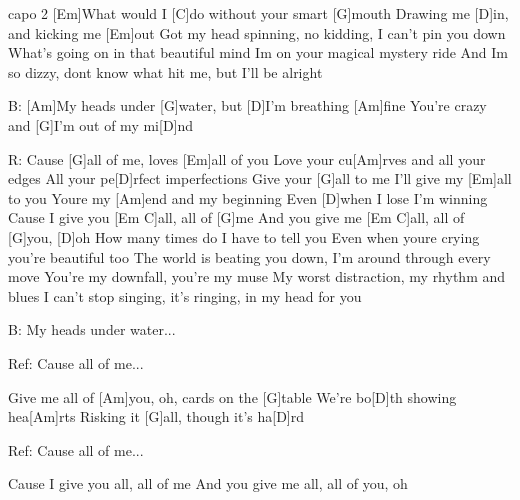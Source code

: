 
capo 2
[Em]What would I [C]do without your smart [G]mouth
Drawing me [D]in, and kicking me [Em]out
Got my head spinning, no kidding, 
I can't pin you down
What's going on in that beautiful mind
Im on your magical mystery ride
And Im so dizzy, dont know what hit me, 
but I'll be alright

B: [Am]My heads under [G]water, but [D]I'm breathing [Am]fine
You're crazy and [G]I'm out of my mi[D]nd

R: Cause [G]all of me, loves [Em]all of you
Love your cu[Am]rves and all your edges
All your pe[D]rfect imperfections
Give your [G]all to me
I'll give my [Em]all to you
Youre my [Am]end and my beginning
Even [D]when I lose I'm winning
Cause I give you [Em C]all, all of [G]me
And you give me [Em C]all, all of [G]you, [D]oh
\columnbreak
How many times do I have to tell you
Even when youre crying you're beautiful too
The world is beating you down, I'm around through every move
You're my downfall, you're my muse
My worst distraction, my rhythm and blues
I can't stop singing, it's ringing, in my head for you

B: My heads under water...

Ref: Cause all of me...

Give me all of [Am]you, oh, cards on the [G]table
We're bo[D]th showing hea[Am]rts
Risking it [G]all, though it's ha[D]rd


Ref: Cause all of me...

Cause I give you all, all of me
And you give me all, all of you, oh

